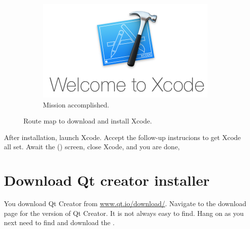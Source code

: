 \begin{figure}
\begin{subfigure}{.5\textwidth}
  \centering
  \includegraphics[width=.9\textwidth]{graphics/xcode-setup-4.png}
  \caption{Mission accomplished.}
\end{subfigure}
\caption{Route map to download and install Xcode.}
\label{fig:xcode}
\end{figure}

After installation, launch Xcode. Accept the follow-up instrucions to get Xcode all set. Await the  () screen, close Xcode, and you are done,

\section{Download Qt creator installer}
You download Qt Creator from \url{www.qt.io/download/}. Navigate to the download page for the  version of Qt Creator. It is not always easy to find. Hang on as you next need to find and download the . 

